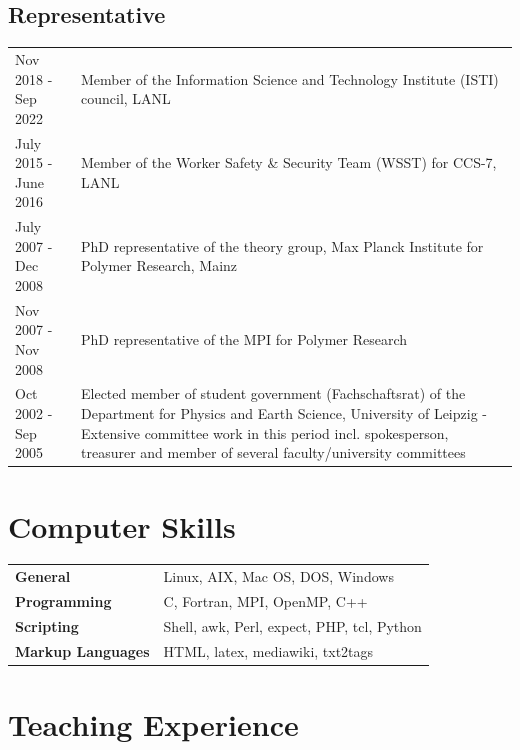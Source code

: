 \documentclass{article}
\begin{document}
\subsection*{Representative}

\begin{tabular}{p{}p{}}
Nov 2018 - Sep 2022 & Member of the Information Science and Technology Institute (ISTI) council, LANL \\
July 2015 - June 2016 & Member of the Worker Safety \& Security Team (WSST) for CCS-7, LANL \\
July 2007 - Dec 2008 & PhD representative of the theory group, Max Planck Institute for Polymer Research, Mainz \\
Nov 2007 - Nov 2008 & PhD representative of the MPI for Polymer Research \\
Oct 2002 - Sep 2005 & Elected member of student government (Fachschaftsrat) of the Department for Physics and Earth Science, University of Leipzig - Extensive committee work in this period incl. spokesperson, treasurer and member of several faculty/university committees \\
\end{tabular}


\section*{Computer Skills}

\begin{tabular}{ll}
\textbf{General} & Linux, AIX, Mac OS, DOS, Windows \\
\textbf{Programming} & C, Fortran, MPI, OpenMP, C++ \\
\textbf{Scripting} & Shell, awk, Perl, expect, PHP, tcl, Python\\
\textbf{Markup Languages} & HTML, latex, mediawiki, txt2tags \\
\end{tabular}

\section*{Teaching Experience}
\vspace{-4mm}
\end{document}
